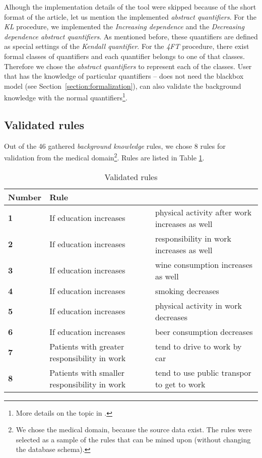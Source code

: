 \documentclass{llncs}
\begin{document}
Alhough the implementation details of the tool were skipped because of the short 
format of the article, let us mention the implemented \emph{abstract quantifiers}.
For the \emph{KL} procedure, we implemented the \emph{Increasing dependence} and
the \emph{Decreasing dependence abstract quantifiers}. As mentioned before, 
these quantifiers are defined as special settings of the \emph{Kendall quantifier}.
For the \emph{4FT} procedure, there exist formal classes of quantifiers and each
quantifier belongs to one of that classes\cite{Classes}. Therefore we chose the
\emph{abstract quantifiers} to represent each of the classes. User that has the
knowledge of particular quantifiers -- does not need the blackbox model (see 
Section~\ref{section:formalization}), can also validate the background knowledge
with the normal quantifiers\footnote{More details on the topic in 
\cite{Diplomka}.}.

\subsection{Validated rules}
Out of the 46 gathered \emph{background knowledge} rules, we chose 8 rules for
validation from the medical domain\footnote{We chose the medical domain, because
the source data exist. The rules were selected as a sample of the rules that can
be mined upon (without changing the database schema).}. Rules are listed in Table
 \ref{tab:rules}. 

\begin{table}[h]
	\centering
	\begin{tabular}{|p{2cm}|p{4cm}|p{4cm}|}
		\hline
			\textbf{Number} & \textbf{Rule} & \\
		\hline
			\textbf{1} & If education increases & physical activity after work increases as well\\
		\hline
			\textbf{2} & If education increases & responsibility in work increases as well\\
		\hline
			\textbf{3} & If education increases & wine consumption increases as well\\
		\hline
			\textbf{4} & If education increases & smoking decreases\\
		\hline
			\textbf{5} & If education increases & physical activity in work decreases\\
		\hline
			\textbf{6} & If education increases & beer consumption decreases\\
		\hline
			\textbf{7} & Patients with greater responsibility in work & tend to drive to work by car\\
		\hline
			\textbf{8} & Patients with smaller responsibility in work & tend to use public transpor to
			get to work\\
		\hline
	\end{tabular}
\caption{Validated rules}
\label{tab:rules}
\end{table}
\end{document}
